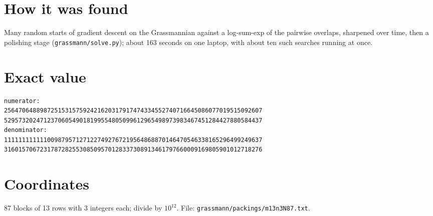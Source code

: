 \documentclass[11pt,a4paper]{article}
\begin{document}
\section{How it was found}
Many random starts of gradient descent on the Grassmannian against a log-sum-exp of the pairwise overlaps, sharpened over time, then a polishing stage (\texttt{grassmann/solve.py}); about 163 seconds on one laptop, with about ten such searches running at once.


\appendix
\section{Exact value}
{\small
\begin{verbatim}
numerator:
256470648898725153157592421620317917474334552740716645086077019515092607
529573202471237060549018199554805099612965498973983467451284427880584437
denominator:
111111111111009879571271227492767219564868870146470546338165296499249637
316015706723178728255308509570128337308913461797660009169805901012718276
\end{verbatim}}

\section{Coordinates}
87 blocks of 13 rows with 3 integers each; divide by $10^{12}$. File: \texttt{grassmann/packings/m13n3N87.txt}.
{\tiny
\begin{multicols}{3}
\end{multicols}}
\end{document}
